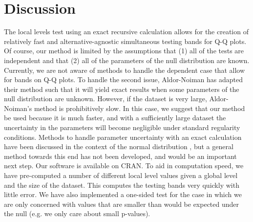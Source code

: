 \documentclass[article]{jss}
\begin{document}
\section{Discussion}
\label{sec:methods}
The local levels test using an exact recursive calculation allows for the creation of relatively fast and alternative-agnostic simultaneous testing bands for Q-Q plots. Of course, our method is limited by the assumptions that (1) all of the tests are independent and that (2) all of the parameters of the null distribution are known. Currently, we are not aware of methods to handle the dependent case that allow for bands on Q-Q plots. To handle the second issue, Aldor-Noiman has adapted their method such that it will yield exact results when some parameters of the null distribution are unknown. However, if the dataset is very large, Aldor-Noiman's method is prohibitively slow. In this case, we suggest that our method be used because it is much faster, and with a sufficiently large dataset the uncertainty in the parameters will become negligible under standard regularity conditions. Methods to handle parameter uncertainty with an exact calculation have been discussed in the context of the normal distribution \citep{rosenkrantz2000confidence}, but a general method towards this end has not been developed, and would be an important next step.
\newline
\newline
Our software is available on CRAN. To aid in computation speed, we have pre-computed a number of different local level values given a global level and the size of the dataset. This computes the testing bands very quickly with little error. We have also implemented a one-sided test for the case in which we are only concerned with values that are smaller than would be expected under the null (e.g. we only care about small p-values).


%
\end{document}
